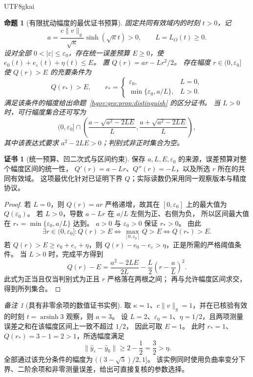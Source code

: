 \documentclass[12pt,a4paper,openany,notitlepage]{report}
\theoremstyle{plain}
\newtheorem{proposition}[theorem]{命题}
\theoremstyle{definition}
\newtheorem*{certificate}{证书}
\theoremstyle{remark}
\newtheorem{remark}[theorem]{备注}
\def\mathcal#1{#1}\def\mathsf#1{#1}\def\mathbb#1{#1}%
\begin{document}
\begin{CJK*}{UTF8}{gkai}
\begin{proposition}[有限扰动幅度的最优证书预算]
\label{exp:geo:prop:amplitude-budget}
固定共同有效域内的时刻 $t>0$，记
\[
a=\frac{c\lVert v\rVert_g}{\sqrt\kappa}\sinh(\sqrt\kappa t)>0,
\qquad L=L_{\mathcal O}(t)\ge0.
\]
设对全部 $0<|\varepsilon|\le\varepsilon_0$，存在统一误差预算 $E\ge0$，使
$e_0(t)+e_\varepsilon(t)+\eta(t)\le E$。
置 $Q(r)=ar-Lr^2/2$。
存在幅度 $r\in(0,\varepsilon_0]$ 使 $Q(r)>E$ 的充要条件为
\[
Q(r_*)>E,\qquad
r_*=
\begin{cases}
\varepsilon_0,&L=0,\\
\min\{\varepsilon_0,a/L\},&L>0.
\end{cases}
\]
满足该条件的幅度给出命题~\ref{hgov:geo:prop:distinguish} 的区分证书。
当 $L>0$ 时，可行幅度集合还可写为
\[
(0,\varepsilon_0]\cap
\left(\frac{a-\sqrt{a^2-2LE}}L,
      \frac{a+\sqrt{a^2-2LE}}L\right),
\]
其中该表达式要求 $a^2-2LE>0$；判别式非正时集合为空。
\end{proposition}
\begin{certificate}[统一预算、凹二次式与区间约束]
保存 $a,L,E,\varepsilon_0$ 的来源，误差预算对整个幅度区间的统一性，
$Q'(r)=a-Lr$、$Q''(r)=-L$，以及所选 $r$ 所在的共同有效域。
这项最优化针对已证明下界 $Q$；实际读数仍采用同一观察版本与精度协议。
\end{certificate}
\begin{proof}
若 $L=0$，则 $Q(r)=ar$ 严格递增，故其在 $[0,\varepsilon_0]$ 上的最大值为
$Q(\varepsilon_0)$。
若 $L>0$，导数 $a-Lr$ 在 $a/L$ 左侧为正、右侧为负，
所以区间最大值在 $r_* =\min\{\varepsilon_0,a/L\}$ 达到。
$a>0$ 与 $\varepsilon_0>0$ 保证 $r_*>0$。
由此
\[
\exists r\in(0,\varepsilon_0]:Q(r)>E
\Longleftrightarrow\max_{[0,\varepsilon_0]}Q>E
\Longleftrightarrow Q(r_*)>E.
\]
若 $Q(r)>E\ge e_0+e_\varepsilon+\eta$，则
$Q(r)-e_0-e_\varepsilon>\eta$，正是所需的严格阈值条件。
当 $L>0$ 时，完成平方得到
\[
Q(r)-E=\frac{a^2-2LE}{2L}
-\frac L2\left(r-\frac aL\right)^2.
\]
此式为正当且仅当判别式为正且 $r$ 严格落在两根之间；
再与允许幅度区间求交，得到所列集合。
\end{proof}

\begin{remark}[具有非零余项的数值证书实例]
取 $\kappa=1$、$c\lVert v\rVert_g=1$，并在已核验有效的时刻
$t=\operatorname{arsinh}3$ 观察，则 $a=3$。
设 $L=2$、$\varepsilon_0=1$、$\eta=1/2$，且两项测量误差之和在该幅度区间上一致不超过 $1/2$，
因此可取 $E=1$。
此时 $r_*=1$、$Q(r_*)=3-1=2>1$，所选幅度满足
\[
\lVert\widehat y_\varepsilon-\widehat y_0\rVert
\ge2-\frac12=\frac32>\eta.
\]
全部通过该充分条件的幅度为
$((3-\sqrt5)/2,1]$。
该实例同时使用负曲率变分下界、二阶余项和非零测量误差，给出可直接复核的参数选择。
\end{remark}


\end{CJK*}
\end{document}
